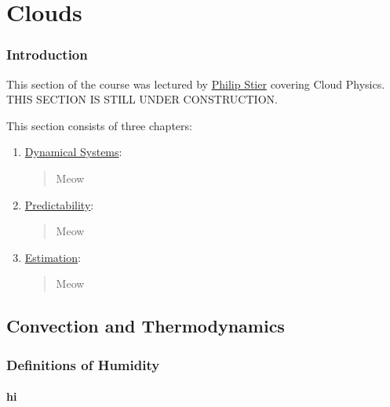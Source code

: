\part{Clouds}\label{Clouds}

\section*{Introduction}

This section of the course was lectured by \href{https://www.physics.ox.ac.uk/our-people/stier}{Philip Stier} covering Cloud Physics. THIS SECTION IS STILL UNDER CONSTRUCTION. \vspace{5 mm}

\noindent This section consists of three chapters:\vspace{5 mm}

\begin{enumerate}
    \item \hyperref[Dynamical Systems]{Dynamical Systems}: 
        
        \begin{quote}
            Meow
        \end{quote}

    \item \hyperref[Predictability]{Predictability}: 
    
        \begin{quote}
            Meow
        \end{quote}
    
    \item \hyperref[Estimation]{Estimation}:
        
        \begin{quote}
            Meow
        \end{quote}
\end{enumerate}

\chapter{Convection and Thermodynamics}\label{Convection Clouds}

\section{Definitions of Humidity}

\subsection{hi}

